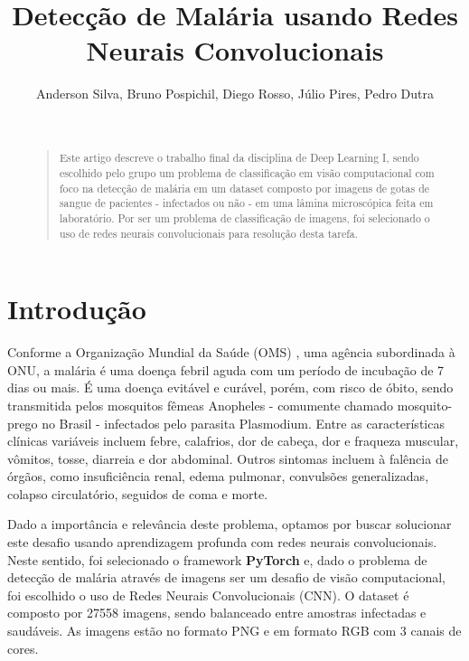 \documentclass{sigchi}
\def\plaintitle{Detecção de Malária usando Redes Neurais Convolucionais}
\begin{document}
\title{\plaintitle}

\author{%
{Anderson Silva, Bruno Pospichil, Diego Rosso, Júlio Pires, Pedro Dutra }
}

\maketitle

\begin{abstract}\
\begin{quote}
Este artigo descreve o trabalho final da disciplina de Deep Learning I, sendo escolhido pelo grupo um problema de classificação em visão computacional com foco na detecção de malária em um dataset composto por imagens de gotas de sangue de pacientes - infectados ou não - em uma lâmina microscópica feita em laboratório. Por ser um problema de classificação de imagens, foi selecionado o uso de redes neurais convolucionais para resolução desta tarefa.
\end{quote}
\end{abstract}

\section{Introdução}
Conforme a Organização Mundial da Saúde (OMS) \cite{WHO}, uma agência subordinada à ONU, a malária é uma doença febril aguda com um período de incubação de 7 dias ou mais. É uma doença evitável e curável, porém, com risco de óbito, sendo transmitida pelos mosquitos fêmeas Anopheles - comumente chamado mosquito-prego no Brasil - infectados pelo parasita Plasmodium. Entre as características clínicas variáveis incluem febre, calafrios, dor de cabeça, dor e fraqueza muscular, vômitos, tosse, diarreia e dor abdominal. Outros sintomas incluem à falência de órgãos, como insuficiência renal, edema pulmonar, convulsões generalizadas, colapso circulatório, seguidos de coma e morte.

Dado a importância e relevância deste problema, optamos por buscar solucionar este desafio usando aprendizagem profunda com redes neurais convolucionais. Neste sentido, foi selecionado o framework \textbf{PyTorch} e, dado o problema de detecção de malária através de imagens ser um desafio de visão computacional, foi escolhido o uso de Redes Neurais Convolucionais (CNN). O dataset é composto por 27558 imagens, sendo balanceado entre amostras infectadas e saudáveis. As imagens estão no formato PNG e em formato RGB com 3 canais de cores.
\end{document}
